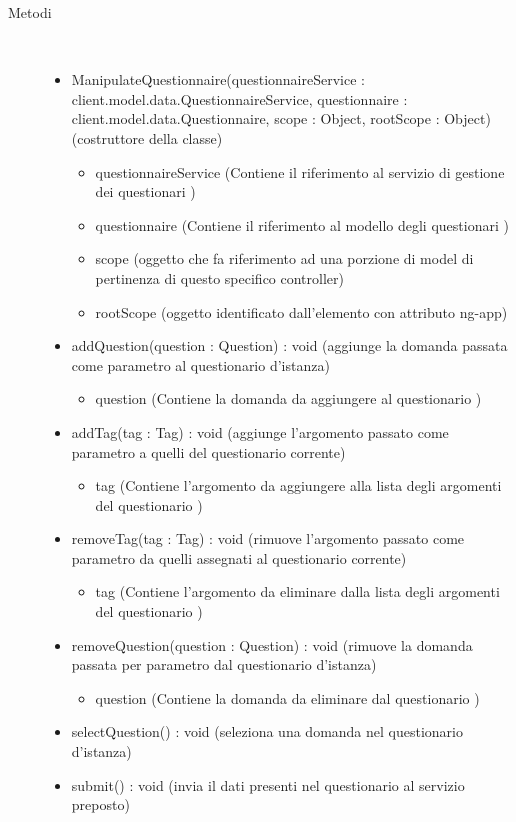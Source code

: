 \begin{description}
\item[Metodi] \hfill \\
 \vspace{-7mm}
\begin{itemize}
\item ManipulateQuestionnaire(questionnaireService : client.model.data.QuestionnaireService, questionnaire : client.model.data.Questionnaire, scope : Object, rootScope : Object) (costruttore della classe)\begin{itemize}
\item questionnaireService (Contiene il riferimento al servizio di gestione dei questionari )
\item questionnaire (Contiene il riferimento al modello degli questionari )
\item scope (oggetto che fa riferimento ad una porzione di model di pertinenza di questo specifico controller)
\item rootScope (oggetto identificato dall’elemento con attributo ng-app)
\end{itemize}

\item addQuestion(question : Question) : void (aggiunge la domanda passata come parametro al questionario d'istanza)\begin{itemize}
\item question (Contiene la domanda da aggiungere al questionario )
\end{itemize}

\item addTag(tag : Tag) : void (aggiunge l'argomento passato come parametro a quelli del questionario corrente)\begin{itemize}
\item tag (Contiene l'argomento da aggiungere alla lista degli argomenti del questionario  )
\end{itemize}

\item removeTag(tag : Tag) : void (rimuove l'argomento passato come parametro da quelli assegnati al questionario corrente)\begin{itemize}
\item tag (Contiene l'argomento da eliminare dalla lista degli argomenti del questionario )
\end{itemize}

\item removeQuestion(question : Question) : void (rimuove la domanda passata per parametro dal questionario d'istanza)\begin{itemize}
\item question (Contiene la domanda da eliminare dal questionario )
\end{itemize}

\item selectQuestion() : void (seleziona una domanda nel questionario d'istanza)
\item submit() : void (invia il dati presenti nel questionario al servizio preposto)
\end{itemize}

\end{description}

